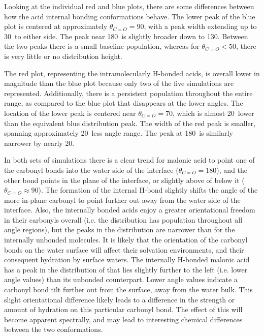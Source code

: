 Looking at the individual red and blue plots, there are some differences between how the acid internal bonding conformations behave. The lower peak of the blue plot is centered at approximately $\theta_{C=O}=90$\degr, with a peak width extending up to 30\degr~to either side. The peak near 180\degr~is slightly broader down to 130\degr. Between the two peaks there is a small baseline population, whereas for $\theta_{C=O} < 50$\degr, there is very little or no distribution height.

The red plot, representing the intramolecularly H-bonded acids, is overall lower in magnitude than the blue plot because only two of the five simulations are represented. Additionally, there is a persistent population throughout the entire \thetacarb range, as compared to the blue plot that disappears at the lower angles. The location of the lower peak is centered near $\theta_{C=O}=70$\degr, which is almost 20\degr~lower than the equivalent blue distribution peak. The width of the red peak is smaller, spanning approximately 20\degr~less angle range. The peak at 180\degr~is similarly narrower by nearly 20\degr.

In both sets of simulations there is a clear trend for malonic acid to point one of the carbonyl bonds into the water side of the interface ($\theta_{C=O}=180$\degr), and the other bond points in the plane of the interface, or slightly above of below it ($\theta_{C=O} \approx 90$\degr). The formation of the internal H-bond slightly shifts the angle of the more in-plane carbonyl to point further out away from the water side of the interface. Also, the internally bonded acids enjoy a greater orientational freedom in their carbonyls overall (i.e. the distribution has population throughout all angle regions), but the peaks in the distribution are narrower than for the internally unbonded molecules. It is likely that the orientation of the carbonyl bonds on the water surface will affect their solvation environments, and their consequent hydration by surface waters. The internally H-bonded malonic acid has a peak in the distribution of \thetacarb that lies slightly further to the left (i.e. lower angle values) than its unbonded counterpart. Lower angle values indicate a carbonyl bond tilt further out from the surface, away from the water bulk. This slight orientational difference likely leads to a difference in the strength or amount of hydration on this particular carbonyl bond. The effect of this will become apparent spectrally, and may lead to interesting chemical differences between the two conformations.
